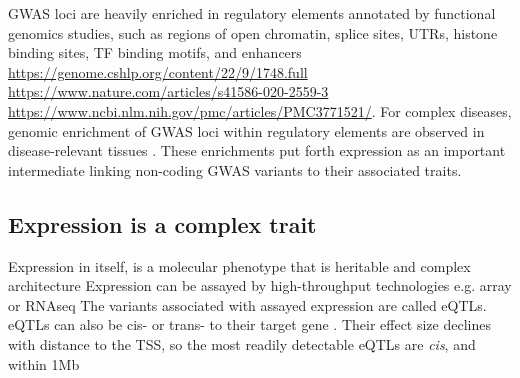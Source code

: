 \begin{outline}
\1 \gls{GWAS} loci are heavily enriched in regulatory elements annotated by functional genomics studies, such as
    regions of open chromatin, 
    splice sites, 
    UTRs,
    histone binding sites, 
    \gls{TF} binding motifs,
    and enhancers \autocite{trynka2015DisentanglingEffectsColocalizing,gallagher2018PostGWASEraAssociation} \url{https://genome.cshlp.org/content/22/9/1748.full} \url{https://www.nature.com/articles/s41586-020-2559-3} \url{https://www.ncbi.nlm.nih.gov/pmc/articles/PMC3771521/}.
\2 For complex diseases, genomic enrichment of GWAS loci within regulatory elements are observed in disease-relevant tissues \autocite{visscher201710YearsGWAS}.
\2 These enrichments put forth expression as an important intermediate linking non-coding \gls{GWAS} variants to their associated traits.

\subsection{Expression is a complex trait}

\1 Expression in itself, is a molecular phenotype that is heritable and complex architecture \autocite{gaffney2013GlobalPropertiesFunctional}
    \2 Expression can be assayed by high-throughput technologies e.g. array or RNAseq
    \2 The variants associated with assayed expression are called \glspl{eQTL}.
    \2 eQTLs can also be cis- or trans- to their target gene \autocite{albert2015RoleRegulatoryVariation}.
    \2 Their effect size declines with distance to the TSS, so the most readily detectable eQTLs are \textit{cis}, and within 1Mb \autocite{vandiedonck2017GeneticAssociationMolecular}


\end{outline}
